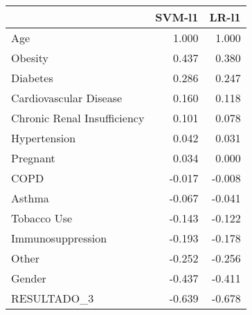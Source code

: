 \begin{tabular}{lrr}
\toprule
{} &  SVM-l1 &  LR-l1 \\
\midrule
Age                         &   1.000 &  1.000 \\
Obesity                     &   0.437 &  0.380 \\
Diabetes                    &   0.286 &  0.247 \\
Cardiovascular Disease      &   0.160 &  0.118 \\
Chronic Renal Insufficiency &   0.101 &  0.078 \\
Hypertension                &   0.042 &  0.031 \\
Pregnant                    &   0.034 &  0.000 \\
COPD                        &  -0.017 & -0.008 \\
Asthma                      &  -0.067 & -0.041 \\
Tobacco Use                 &  -0.143 & -0.122 \\
Immunosuppression           &  -0.193 & -0.178 \\
Other                       &  -0.252 & -0.256 \\
Gender                      &  -0.437 & -0.411 \\
RESULTADO\_3                 &  -0.639 & -0.678 \\
\bottomrule
\end{tabular}
